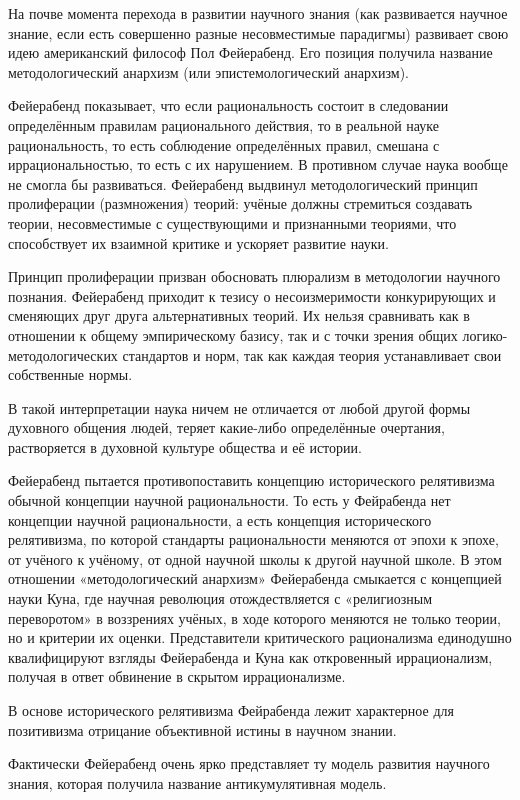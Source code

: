 \documentclass[exam_answers.tex]{subfiles}
\begin{document}
\renewcommand{\baselinestretch}{\blch}

На почве момента перехода в развитии научного знания (как развивается научное знание, если есть совершенно разные несовместимые парадигмы) развивает свою идею американский философ Пол Фейерабенд.
Его позиция получила название методологический анархизм (или эпистемологический анархизм).

Фейерабенд показывает, что если рациональность состоит в следовании определённым правилам рационального действия, то в реальной науке рациональность, то есть соблюдение определённых правил, смешана с иррациональностью, то есть с их нарушением.
В противном случае наука вообще не смогла бы развиваться.
Фейерабенд выдвинул методологический принцип пролиферации (размножения) теорий: учёные должны стремиться создавать теории, несовместимые с существующими и признанными теориями, что способствует их взаимной критике и ускоряет развитие науки.

Принцип пролиферации призван обосновать плюрализм в методологии научного познания. Фейерабенд приходит к тезису о несоизмеримости конкурирующих и сменяющих друг друга альтернативных теорий.
Их нельзя сравнивать как в отношении к общему эмпирическому базису, так и с точки зрения общих логико-методологических стандартов и норм, так как каждая теория устанавливает свои собственные нормы.

В такой интерпретации наука ничем не отличается от любой другой формы духовного общения людей, теряет какие-либо определённые очертания, растворяется в духовной культуре общества и её истории.

Фейерабенд пытается противопоставить концепцию исторического релятивизма обычной концепции научной рациональности.
То есть у Фейрабенда нет концепции научной рациональности, а есть концепция исторического релятивизма, по которой стандарты рациональности меняются от эпохи к эпохе, от учёного к учёному, от одной научной школы к другой научной школе.
В этом отношении «методологический анархизм» Фейерабенда смыкается с концепцией науки Куна, где научная революция отождествляется с «религиозным переворотом» в воззрениях учёных, в ходе которого меняются не только теории, но и критерии их оценки.
Представители критического рационализма единодушно квалифицируют взгляды Фейерабенда и Куна как откровенный иррационализм, получая в ответ обвинение в скрытом иррационализме.

В основе исторического релятивизма Фейрабенда лежит характерное для позитивизма отрицание объективной истины в научном знании.

Фактически Фейерабенд очень ярко представляет ту модель развития научного знания, которая получила название антикумулятивная модель.
\end{document}
